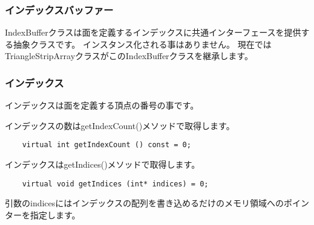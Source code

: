 
\subsubsection{インデックスバッファー}

IndexBufferクラスは面を定義するインデックスに共通インターフェースを提供する抽象クラスです。
インスタンス化される事はありません。
現在ではTriangleStripArrayクラスがこのIndexBufferクラスを継承します。

\subsubsection{インデックス}

インデックスは面を定義する頂点の番号の事です。

インデックスの数はgetIndexCount()メソッドで取得します。

\begin{verbatim}
    virtual int getIndexCount () const = 0;
\end{verbatim}

インデックスはgetIndices()メソッドで取得します。

\begin{verbatim}
    virtual void getIndices (int* indices) = 0;
\end{verbatim}

引数のindicesにはインデックスの配列を書き込めるだけのメモリ領域へのポインターを指定します。


